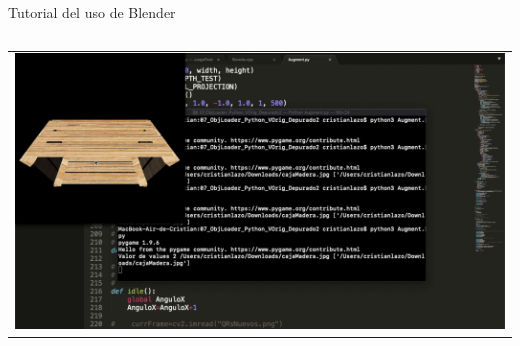 \begin{frame}{Tutorial del uso de Blender \footnotemark}
\begin{columns}
\begin{column}{0.23\textwidth}
\begin{center}
\begin{tabular}{c}
		        \includegraphics[width=0.75\linewidth]{Figs/VideoBlender12}\\
	    \end{tabular}
    \end{center}	
\end{column}

\end{columns}
\end{frame}

